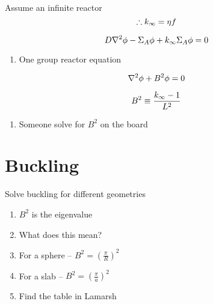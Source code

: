 \documentclass[aspectratio=1610,pdftex,dvipsnames,compress,xcolor={dvipsnames}]{beamer}
\begin{document}
\begin{frame}{Assume an infinite reactor}
    \begin{equation}
        \LARGE
        \therefore k_\infty = \eta f
    \end{equation}

    \begin{equation}
        \LARGE
        D \nabla^2 \phi - \Sigma_A \phi + k_\infty \Sigma_A \phi = 0
    \end{equation}

    \vspace*{\fill}

    \begin{enumerate}[series=outerlist,topsep=0pt,itemsep=21pt,leftmargin=*,label=(\arabic*)]
        \item[]One group reactor equation
    \end{enumerate}

    \vspace*{\fill}

    \begin{equation}
        \LARGE
        \nabla^2 \phi + B^2 \phi = 0
    \end{equation}

    \begin{equation}
        \LARGE
        B^2 \equiv \frac{k_\infty - 1}{L^2}
    \end{equation}

    \vspace*{\fill}

    \begin{enumerate}[series=outerlist,topsep=0pt,itemsep=21pt,leftmargin=*,label=(\arabic*)]
        \item[]Someone solve for $B^2$ on the board
    \end{enumerate}
\end{frame}


\section{Buckling}


\addtocounter{framenumber}{-1} 
\begin{frame}{Solve buckling for different geometries}
    \begin{enumerate}[series=outerlist,topsep=0pt,itemsep=21pt,leftmargin=*,label=(\arabic*)]
        \item[]$B^2$ is the eigenvalue
        \item[]What does this mean?
        \item[]For a sphere -- $B^2 = (\frac{\pi}{R})^2$
        \item[]For a slab -- $B^2 = (\frac{\pi}{a})^2$
        \item[]Find the table in Lamarsh
    \end{enumerate}
\end{frame}
\end{document}
